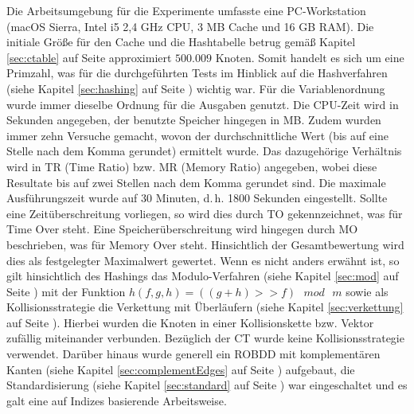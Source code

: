 Die Arbeitsumgebung für die Experimente umfasste eine PC-Workstation (macOS Sierra, Intel i5 2,4 GHz CPU, 3 MB Cache und 16 GB RAM). Die initiale Größe für den Cache und die Hashtabelle betrug gemäß Kapitel \ref{sec:ctable} auf Seite \pageref{sec:ctable} approximiert $500.009$ Knoten. Somit handelt es sich um eine Primzahl, was für die durchgeführten Tests im Hinblick auf die Hashverfahren (siehe Kapitel \ref{sec:hashing} auf Seite \pageref{sec:hashing}) wichtig war. Für die Variablenordnung wurde immer dieselbe Ordnung für die Ausgaben genutzt. Die CPU-Zeit wird in Sekunden angegeben, der benutzte Speicher hingegen in MB. Zudem wurden immer zehn Versuche gemacht, wovon der durchschnittliche Wert (bis auf eine Stelle nach dem Komma gerundet) ermittelt wurde. Das dazugehörige Verhältnis wird in \glqq TR\grqq{} (Time Ratio) bzw. \glqq MR\grqq{} (Memory Ratio) angegeben, wobei diese Resultate bis auf zwei Stellen nach dem Komma gerundet sind. Die maximale Ausführungszeit wurde auf 30 Minuten, d.\,h. 1800 Sekunden eingestellt. Sollte eine Zeitüberschreitung vorliegen, so wird dies durch \glqq TO\grqq{} gekennzeichnet, was für \glqq Time Over\grqq{} steht. Eine Speicherüberschreitung wird hingegen durch \glqq MO\grqq{} beschrieben, was für \glqq Memory Over\grqq{} steht. Hinsichtlich der Gesamtbewertung wird dies als festgelegter Maximalwert gewertet. Wenn es nicht anders erwähnt ist, so gilt hinsichtlich des Hashings das Modulo-Verfahren (siehe Kapitel \ref{sec:mod} auf Seite \pageref{sec:mod}) mit der Funktion $h(f, g, h) = ( (g + h) >> f) \text{ }mod\text{ } m$ sowie als Kollisionsstrategie die Verkettung mit Überläufern (siehe Kapitel \ref{sec:verkettung} auf Seite \pageref{sec:verkettung}). Hierbei wurden die Knoten in einer Kollisionskette bzw. Vektor zufällig miteinander verbunden. Bezüglich der CT wurde keine Kollisionsstrategie verwendet. Darüber hinaus wurde generell ein ROBDD mit komplementären Kanten (siehe Kapitel \ref{sec:complementEdges} auf Seite \pageref{sec:complementEdges}) aufgebaut, die Standardisierung (siehe Kapitel \ref{sec:standard} auf Seite \pageref{sec:standard}) war eingeschaltet und es galt eine auf Indizes basierende Arbeitsweise.

